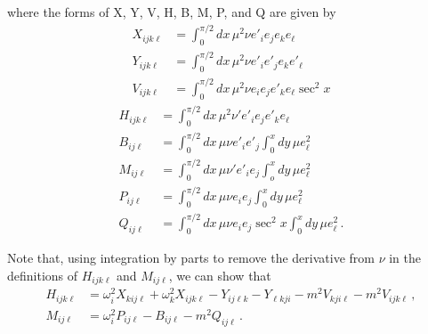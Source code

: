 \documentclass[letterpaper,11pt]{article}
\newcommand{\oi}{\omega_i}
\newcommand{\ok}{\omega_k}
\begin{document}
where the forms of X, Y, V, H, B, M, P, and Q are given by
\begin{align}
X_{ijk\ell} &= \int^{\pi/2}_0 dx \, \mu^2 \nu e'_i e_j e_k e_\ell \\
Y_{ijk\ell} &= \int^{\pi/2}_0 dx \, \mu^2 \nu e'_i e'_j e_k e'_\ell \\
V_{ijk\ell} &= \int^{\pi/2}_0 dx \, \mu^2 \nu e_i e_j e'_k e_\ell \sec^2 x
\end{align}
\begin{align}
H_{ijk\ell} &= \int^{\pi/2}_0 dx \, \mu^2 \nu' e'_i e_j e'_k e_\ell \\
B_{ij\ell} &= \int^{\pi/2}_0 dx \, \mu \nu e'_i e'_j \int^x_0 dy \, \mu e^2_\ell \\
M_{ij\ell} &= \int^{\pi/2}_0 dx \, \mu \nu' e'_i e_j \int^x_o dy \, \mu e_\ell^2 \\
P_{ij\ell} &= \int^{\pi/2}_0 dx \, \mu \nu e_i e_j \int^x_0 dy \, \mu e^2_\ell \\
Q_{ij\ell} &= \int^{\pi/2}_0 dx \, \mu \nu e_i e_j \sec^2 x \int^x_0 dy \, \mu e^2_\ell \, .
\end{align}

Note that, using integration by parts to remove the derivative from $\nu$ in the definitions of $H_{ijk\ell}$ and $M_{ij\ell}$, we can show that
\begin{align}
H_{ijk\ell} &= \oi^2 X_{kij\ell} + \ok^2 X_{ijk\ell} - Y_{ij\ell k}  - Y_{\ell kji}   - m^2 V_{kji\ell} -m^2 V_{ijk\ell} \, , \\
M_{ij\ell} &= \oi^2 P_{ij\ell} - B_{ij\ell} -m^2 Q_{ij\ell} \, .
\end{align}
\end{document}
